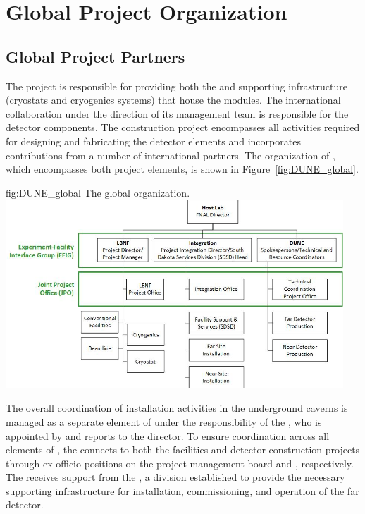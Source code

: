 \section{Global Project Organization}   %
\label{sec:exec-tc-partners}

\subsection{Global Project Partners}

The  project is responsible for providing both the
 and supporting infrastructure (cryostats and
cryogenics systems) that house the  
modules. 
The international 
collaboration under the direction of its management team is
responsible for the detector components.  The  
construction project encompasses all activities required for designing
and fabricating the detector elements and incorporates contributions
from a number of international partners.  The organization of %
, which encompasses both project elements, is
shown in Figure~\ref{fig:DUNE_global}.

\begin{dunefigure}{fig:DUNE_global}
  {The global  organization.}
  \includegraphics[width=0.95\textwidth]{graphics/FS_Integration_OrgChart_notitle}
\end{dunefigure}

The overall
coordination of installation activities in the underground caverns 
is managed as a separate element of  under the
responsibility of the , who is appointed by and reports
to the  director.  To ensure coordination across
all elements of , the  connects to both
the facilities and detector construction projects through ex-officio
positions on the  project management board and
 , respectively.  The  receives support from the ,
a  division established to 
provide the necessary supporting infrastructure for installation, commissioning, and operation 
of the  far detector. 

